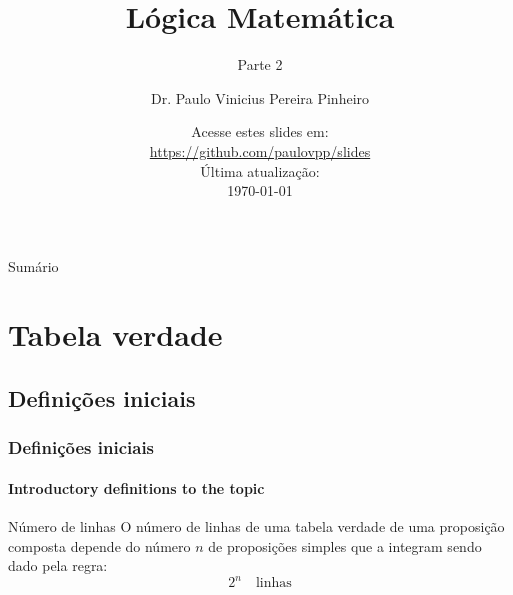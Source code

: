 \documentclass[10pt, headsepline, captions=tableabove, xcolor=table]{beamer}
\title{Lógica Matemática}
\subtitle{Parte 2}
\author[Paulo Pinheiro]
{Dr. Paulo Vinicius Pereira Pinheiro\inst{1}}
\institute[UNIFAP]
{
    \inst{1}
    Centro Universitário Paraíso do Ceará\\
    UNIFAP
}
\date{\small{Acesse estes slides em:\\ \url{https://github.com/paulovpp/slides}}\newline \\Última atualização:\\ \today}
\begin{document}
\begin{frame}
    \titlepage
\end{frame}

\logo{}

\begin{frame}[t]{Sumário}
    \tableofcontents[sections={1-3}]
\end{frame}
%

\section{Tabela verdade}
%
\subsection{Definições iniciais}
%
\begin{frame}[c]
    \frametitle{Definições iniciais}
    \framesubtitle{Introductory definitions to the topic}
    \begin{block}{Número de linhas}
        O número de linhas de uma tabela verdade de uma proposição composta depende do número $n$ de proposições simples que a integram sendo dado pela regra: \\[2pt]
        \begin{equation}
            2^n \quad \text{linhas}
        \end{equation}
    \end{block}
\end{frame}
%
\end{document}
